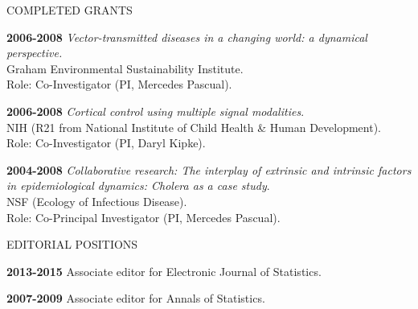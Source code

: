 \begin{mylist} {COMPLETED GRANTS}
\item{\bf 2006-2008 } {\em Vector-transmitted diseases in a changing world: a dynamical perspective.}\\
Graham Environmental Sustainability Institute.\\
Role: Co-Investigator (PI, Mercedes Pascual). 

\item{\bf 2006-2008 } {\em Cortical control using multiple signal modalities}.\\
NIH (R21 from National Institute of Child Health \& Human Development).\\
Role: Co-Investigator (PI, Daryl Kipke).

\item{\bf 2004-2008 } {\em Collaborative research: The
  interplay of extrinsic and intrinsic factors in epidemiological
  dynamics: Cholera as a case study}.\\
NSF (Ecology of Infectious Disease).\\
Role: Co-Principal Investigator (PI, Mercedes Pascual).

 
\end{mylist}

\lsp
\begin{mylist}{EDITORIAL POSITIONS}
\item{\bf 2013-2015} Associate editor for Electronic Journal of Statistics.

\item{\bf 2007-2009} Associate editor for Annals of Statistics.

\end{mylist}

\lsp



